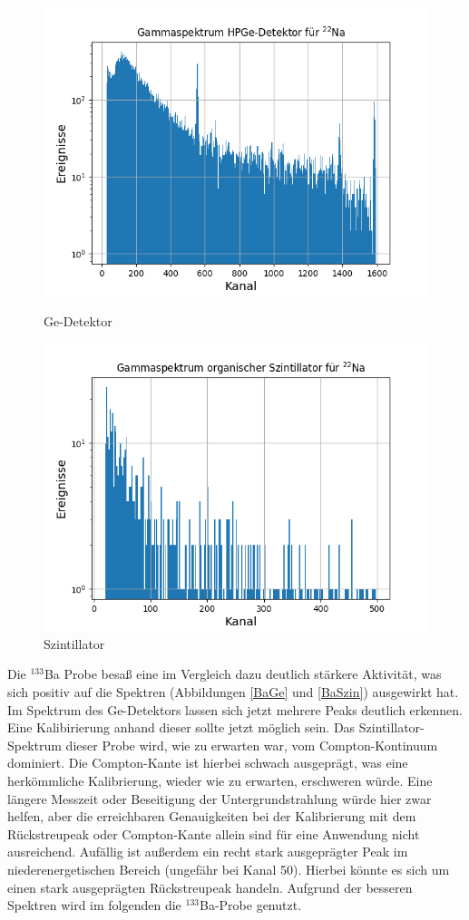 \begin{figure}[h]
  \includegraphics[width=\linewidth]{images/Na22ge.png}
  \caption{Ge-Detektor}
  \label{NaGe}
\endminipage\hfill
{}
  \includegraphics[width=\linewidth]{images/Na22szin.png}
  \caption{Szintillator}
  \label{NaSzin}
\endminipage\hfill
\end{figure}

Die $^{133}$Ba Probe besaß eine im Vergleich dazu deutlich stärkere Aktivität, was sich positiv auf die Spektren (Abbildungen \ref{BaGe} und \ref{BaSzin}) ausgewirkt hat.
Im Spektrum des Ge-Detektors lassen sich jetzt mehrere Peaks deutlich erkennen.
Eine Kalibirierung anhand dieser sollte jetzt möglich sein.
Das Szintillator-Spektrum dieser Probe wird, wie  zu erwarten war, vom Compton-Kontinuum dominiert.
Die Compton-Kante ist hierbei schwach ausgeprägt, was eine herkömmliche Kalibrierung, wieder wie zu erwarten, erschweren würde.
Eine längere Messzeit oder Beseitigung der Untergrundstrahlung würde hier zwar helfen, aber die erreichbaren Genauigkeiten bei der Kalibrierung mit dem Rückstreupeak oder Compton-Kante allein sind für eine Anwendung nicht ausreichend.
Aufällig ist außerdem ein recht stark ausgeprägter Peak im niederenergetischen Bereich (ungefähr bei Kanal 50).
Hierbei könnte es sich um einen stark ausgeprägten Rückstreupeak handeln.
Aufgrund der besseren Spektren wird im folgenden die $^{133}$Ba-Probe genutzt.

